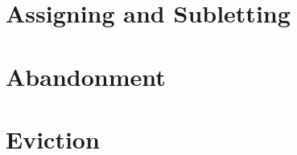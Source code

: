 \section{Assigning and Subletting}





\begin{questions}[Problems]

\end{questions}


\section{Abandonment}





\begin{questions}

\end{questions}



\section{Eviction}





\begin{questions}

\end{questions}


